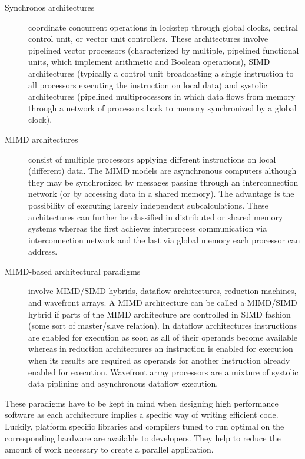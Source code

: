 \begin{description}
\item[Synchronos architectures] coordinate concurrent operations in
  lockstep through global clocks, central control unit, or vector unit
  controllers. These architectures involve pipelined vector processors
  (characterized by multiple, pipelined functional units, which
  implement arithmetic and Boolean operations), SIMD architectures
  (typically a control unit broadcasting a single instruction to
  all processors executing the instruction on local data) and systolic
  architectures (pipelined multiprocessors in which data flows from
  memory through a network of processors back to memory synchronized
  by a global clock). 
\item[MIMD architectures] consist of multiple processors applying
  different instructions on local (different) data. The MIMD models
  are asynchronous computers although they may be synchronized by
  messages passing through an interconnection network (or by accessing
  data in a shared memory). The advantage is the possibility of
  executing largely independent subcalculations. These architectures
  can further be classified in distributed or shared memory systems
  whereas the first achieves interprocess communication via 
  interconnection network and the last via global memory each
  processor can address.
\item[MIMD-based architectural paradigms] involve MIMD/SIMD hybrids,
  dataflow architectures, reduction machines, and wavefront arrays. A
  MIMD architecture can be called a MIMD/SIMD hybrid if parts of the
  MIMD architecture are controlled in SIMD fashion (some sort of
  master/slave relation). In dataflow architectures instructions are
  enabled for execution as soon as all of their operands become
  available whereas in reduction architectures an instruction is
  enabled for execution when its results are required as operands for
  another instruction already enabled for execution. Wavefront array
  processors are a mixture of systolic data piplining and asynchronous
  dataflow execution.
\end{description}

These paradigms have to be kept in mind when designing high performance
software as each architecture implies a specific way of writing
efficient code. Luckily, platform specific libraries and compilers
tuned to run optimal on the corresponding hardware are available to
developers. They help to reduce the amount of work necessary to
create a parallel application.

